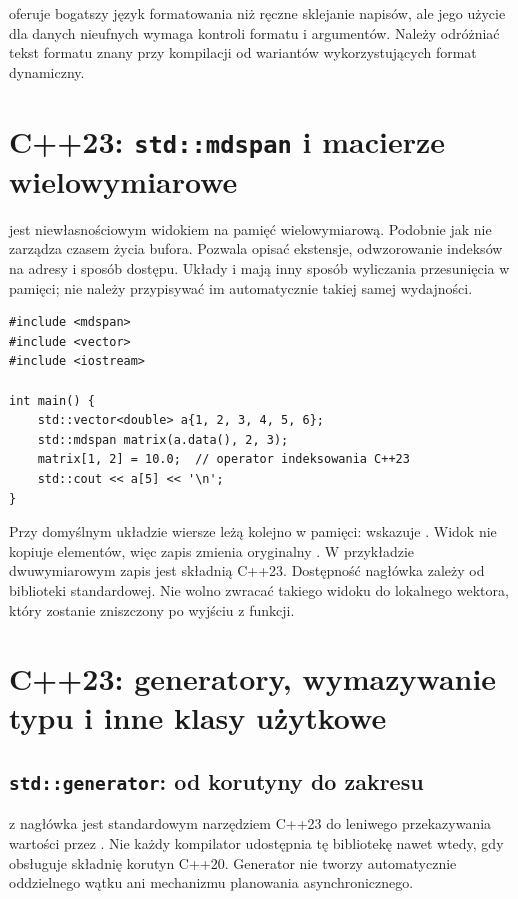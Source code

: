  oferuje bogatszy język formatowania niż ręczne
sklejanie napisów, ale jego użycie dla danych nieufnych wymaga
kontroli formatu i argumentów. Należy odróżniać tekst formatu
znany przy kompilacji od wariantów wykorzystujących format dynamiczny.

\section{C++23: \texttt{std::mdspan} i macierze wielowymiarowe}
\label{sec:cpp21-mdspan}

 jest niewłasnościowym widokiem na pamięć
wielowymiarową. Podobnie jak  nie zarządza czasem życia
bufora. Pozwala opisać ekstensje, odwzorowanie indeksów na adresy
i sposób dostępu. Układy  i 
mają inny sposób wyliczania przesunięcia w pamięci; nie należy
przypisywać im automatycznie takiej samej wydajności.

\begin{lstlisting}[caption={Macierz 2 x 3 przechowywana w vector (C++23).}]
#include <mdspan>
#include <vector>
#include <iostream>

int main() {
    std::vector<double> a{1, 2, 3, 4, 5, 6};
    std::mdspan matrix(a.data(), 2, 3);
    matrix[1, 2] = 10.0;  // operator indeksowania C++23
    std::cout << a[5] << '\n';
}
\end{lstlisting}

Przy domyślnym układzie  wiersze leżą kolejno
w pamięci:  wskazuje . Widok
 nie kopiuje elementów, więc zapis zmienia oryginalny
. W przykładzie dwuwymiarowym zapis 
jest składnią C++23. Dostępność nagłówka  zależy od
biblioteki standardowej. Nie wolno zwracać takiego widoku do lokalnego
wektora, który zostanie zniszczony po wyjściu z funkcji.

\section{C++23: generatory, wymazywanie typu i inne klasy użytkowe}

\subsection{\texttt{std::generator}: od korutyny do zakresu}

 z nagłówka  jest standardowym
narzędziem C++23 do leniwego przekazywania wartości przez .
Nie każdy kompilator udostępnia tę bibliotekę nawet wtedy, gdy
obsługuje składnię korutyn C++20. Generator nie tworzy automatycznie
oddzielnego wątku ani mechanizmu planowania asynchronicznego.

